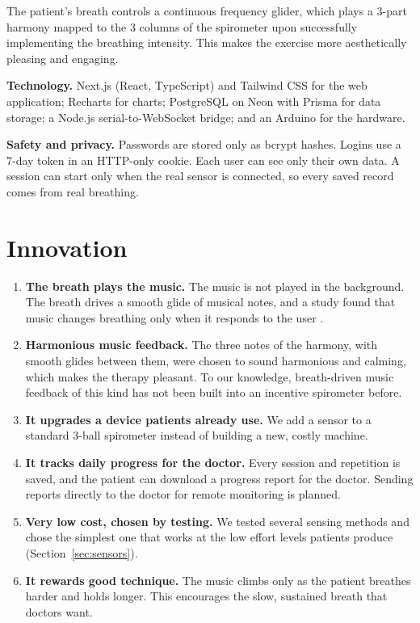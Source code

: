 \documentclass[12pt,a4paper]{article}
\begin{document}
The patient's breath controls a continuous frequency glider, which plays a 3-part harmony mapped to the 3 columns of the spirometer upon successfully implementing the breathing intensity. This makes the exercise more aesthetically pleasing and engaging.

\textbf{Technology.} Next.js (React, TypeScript) and Tailwind CSS for the web application; Recharts for charts; PostgreSQL on Neon with Prisma for data storage; a Node.js serial-to-WebSocket bridge; and an Arduino for the hardware.

\textbf{Safety and privacy.} Passwords are stored only as bcrypt hashes. Logins use a 7-day token in an HTTP-only cookie. Each user can see only their own data. A session can start only when the real sensor is connected, so every saved record comes from real breathing.

\section{Innovation}

\begin{enumerate}
  \item \textbf{The breath plays the music.} The music is not played in the background. The breath drives a smooth glide of musical notes, and a study found that music changes breathing only when it responds to the user \cite{bhandari}.
  \item \textbf{Harmonious music feedback.} The three notes of the harmony, with smooth glides between them, were chosen to sound harmonious and calming, which makes the therapy pleasant. To our knowledge, breath-driven music feedback of this kind has not been built into an incentive spirometer before.
  \item \textbf{It upgrades a device patients already use.} We add a sensor to a standard 3-ball spirometer instead of building a new, costly machine.
  \item \textbf{It tracks daily progress for the doctor.} Every session and repetition is saved, and the patient can download a progress report for the doctor. Sending reports directly to the doctor for remote monitoring is planned.
  \item \textbf{Very low cost, chosen by testing.} We tested several sensing methods and chose the simplest one that works at the low effort levels patients produce (Section~\ref{sec:sensors}).
  \item \textbf{It rewards good technique.} The music climbs only as the patient breathes harder and holds longer. This encourages the slow, sustained breath that doctors want.
\end{enumerate}
\end{document}

